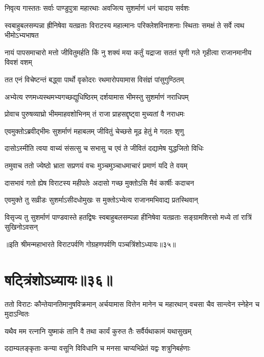 \twolineshloka
{निवृत्य गास्ततः सर्वाः पाण्डुपुत्रा महारथाः}
{अवजित्य सुशर्माणं धनं चादाय सर्वशः}


\threelineshloka
{स्वबाहुबलसम्पन्ना ह्रीनिषेवा यतव्रताः}
{विराटस्य महात्मानः परिक्लेशविनाशनाः}
{स्थिताः समक्षं ते सर्वे त्वथ भीमोऽभ्यभाषत}


\threelineshloka
{नायं पापसमाचारो मत्तो जीवितुमर्हति}
{किं नु शक्यं मया कर्तुं यद्राजा सततं घृणी}
{गले गृहीत्वा राजानमानीय विवशं वशम्}


\twolineshloka
{तत एनं विचेष्टन्तं बद्ध्वा पार्थो वृकोदरः}
{रथमारोपयामास विसंज्ञं पांसुगुण्ठितम्}


\twolineshloka
{अभ्येत्य रणमध्यस्थमभ्यगच्छद्युधिष्ठिरम्}
{दर्शयामास भीमस्तु सुशर्माणं नराधिपम्}


\twolineshloka
{प्रोवाच पुरुषव्याघ्रो भीममाहवशोभिनम्}
{तं राजा प्राहसद्दृष्ट्वा मुच्यतां वै नराधमः}


\twolineshloka
{एवमुक्तोऽब्रवीद्भीमः सुशर्माणं महाबलम्}
{जीवितुं चेच्छसे मूढ हेतुं मे गदतः शृणु}


\twolineshloka
{दासोऽस्मीति त्वया वाच्यं संसत्सु च सभासु च}
{एवं ते जीवितं दद्यामेष युद्धजितो विधिः}


\twolineshloka
{तमुवाच ततो ज्येष्ठो भ्राता सप्रणयं वचः}
{मुञ्चमुञ्चाधमाचारं प्रमाणं यदि ते वयम्}


\twolineshloka
{दासभावं गतो ह्येष विराटस्य महीपतेः}
{अदासो गच्छ मुक्तोऽसि मैवं कार्षीः कदाचन}


\twolineshloka
{एवमुक्ते तु सव्रीडः सुशर्माऽसीदधोमुखः}
{स मुक्तोऽभ्येत्य राजानमभिवाद्य प्रतस्थिवान्}


\threelineshloka
{विसृज्य तु सुशर्माणं पाण्डवास्ते हतद्विषः}
{स्वबाहुबलसम्पन्ना हीनिषेवा यतव्रताः}
{सङ्ग्रामशिरसो मध्ये तां रात्रिं सुखिनोऽवसन्}

॥इति श्रीमन्महाभारते विराटपर्वणि गोग्रहणपर्वणि पञ्चत्रिंशोऽध्यायः॥३५॥

\chapter{षट्त्रिंशोऽध्यायः॥३६॥}

\threelineshloka
{ततो विराटः कौन्तेयानतिमानुषविक्रमान्}
{अर्चयामास वित्तेन मानेन च महारथान्}
{वचसा चैव सान्त्वेन स्नेहेन च मुदाऽन्वितः}




\twolineshloka
{यथैव मम रत्नानि युष्माकं तानि वै तथा}
{कार्यं कुरुत तैः सर्वैर्यथाकामं यथासुखम्}


\twolineshloka
{ददाम्यलङ्कृताः कन्या वसूनि विविधानि च}
{मनसा चाप्यभिप्रेतं यद्वः शत्रुनिबर्हणाः}


